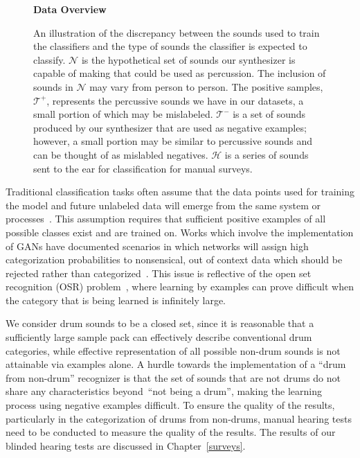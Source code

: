\documentclass[\main/thesis.tex]{subfiles}
\begin{document}
\begin{figure}[]
    \begin{center}
    \textbf{Data Overview}
    \end{center}
    \caption{ An illustration of the discrepancy between the sounds used to train the classifiers and the type of sounds the classifier is expected to classify. $\mathcal{N}$ is the hypothetical set of sounds our synthesizer is capable of making that could be used as percussion. The inclusion of sounds in $\mathcal{N}$ may vary from person to person. The positive samples, $\mathcal{T^{+}}$, represents the percussive sounds we have in our datasets, a small portion of which may be mislabeled. $\mathcal{T^{-}}$ is a set of sounds produced by our synthesizer that are used as negative examples; however, a small portion may be similar to percussive sounds and can be thought of as mislabled negatives. $\mathcal{H}$ is a series of sounds sent to the ear for classification for manual surveys.}
\label{fig:ven_data}
\end{figure}

Traditional classification tasks often assume that the data points used for training the model and future unlabeled data will emerge from the same system or processes~\cite{geng2020recent,mundt2019open}. This assumption requires that sufficient positive examples of all possible classes exist and are trained on. Works which involve the implementation of GANs have documented scenarios in which networks will assign high categorization probabilities to nonsensical, out of context data which should be rejected rather than categorized~\cite{geng2020recent,mundt2019open,hassen2020learning}. This issue is reflective of the open set recognition (OSR) problem~\cite{geng2020recent,mundt2019open}, where learning by examples can prove difficult when the category that is being learned is infinitely large. 

We consider drum sounds to be a closed set, since it is reasonable that a sufficiently large sample pack can effectively describe conventional drum categories, while effective representation of all possible non-drum sounds is not attainable via examples alone. A hurdle towards the implementation of a \enquote{drum from non-drum} recognizer is that the set of sounds that are not drums do not share any characteristics beyond~\enquote{not being a drum}, making the learning process using negative examples difficult.  To ensure the quality of the results, particularly in the categorization of drums from non-drums, manual hearing tests need to be conducted to measure the quality of the results. The results of our blinded hearing tests are discussed in Chapter~\ref{surveys}.
\end{document}
